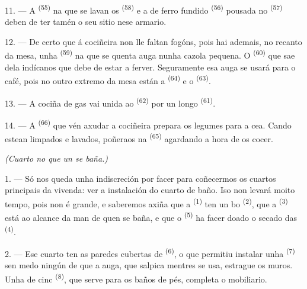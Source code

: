 \VUsaut{4.0mm}
\VUsaut{3.0mm}

11. --- A  \textsuperscript{(55)} na que se lavan os 
\textsuperscript{(58)} e a  de ferro fundido \textsuperscript{(56)} pousada
no  \textsuperscript{(57)} deben de ter tamén o seu sitio nese
armario.

12. --- De certo que á cociñeira non lle faltan fogóns, pois hai ademais, no recanto da mesa,
unha  \textsuperscript{(59)} na que se quenta auga nunha cazola pequena.
O  \textsuperscript{(60)} que sae dela indícanos que debe de estar a ferver.
Seguramente esa auga se usará para o café, pois no outro extremo da mesa están a
 \textsuperscript{(64)} e o
 \textsuperscript{(63)}.

13. --- A cociña de gas vai unida ao  \textsuperscript{(62)} por un
longo  \textsuperscript{(61)}.

14. --- A  \textsuperscript{(66)} que vén axudar a cociñeira prepara os
legumes para a cea. Cando estean limpados e lavados, poñeraos na
 \textsuperscript{(65)} agardando a hora de os cocer.

\VUsaut{4.0mm}
{\centering\fontsize{10.2pt}{10.2pt}\selectfont{} \textit{(Cuarto no que un se baña.)}\par}
\VUsaut{3.0mm}

1. --- Só nos queda unha indiscreción por facer para coñecermos os cuartos principais da
vivenda: ver a instalación do cuarto de baño. Iso non levará moito tempo, pois non é grande, e
saberemos axiña que a  \textsuperscript{(1)} ten un bo
 \textsuperscript{(2)}, que a 
\textsuperscript{(3)} está ao alcance da man de quen se baña, e que o
 \textsuperscript{(5)} ha facer doado o secado das
 \textsuperscript{(4)}.

2. --- Ese cuarto ten as paredes cubertas de  \textsuperscript{(6)}, o que
permitiu instalar unha  \textsuperscript{(7)} sen medo ningún de que a auga, que
salpica mentres se usa, estrague os muros. Unha  de cinc \textsuperscript{(8)},
que serve para os baños de pés, completa o mobiliario.
\VUsaut{6.0mm}
\VUfilet{22mm}
